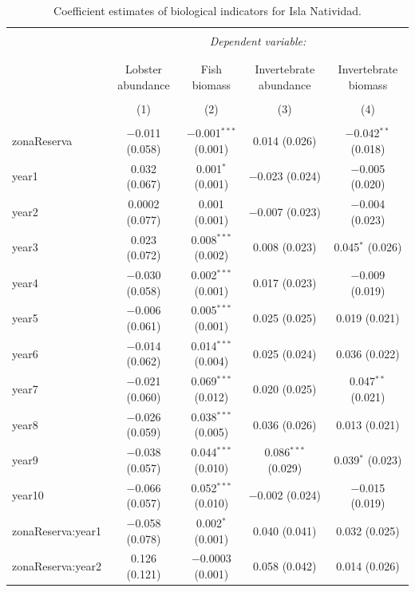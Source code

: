 \documentclass[utf8]{frontiers_suppmat} %
\begin{document}
\begin{table}[!htbp] \centering 
  \caption{Coefficient estimates of biological indicators for Isla Natividad.} 
  \label{} 
\tiny 
\begin{tabular}{@{\extracolsep{1pt}}lcccc} 
\\[-1.8ex]\hline 
\hline \\[-1.8ex] 
 & \multicolumn{4}{c}{\textit{Dependent variable:}} \\ 
\cline{2-5} 
\\[-1.8ex] & \multicolumn{4}{c}{} \\ 
 & Lobster abundance & Fish biomass & Invertebrate abundance & Invertebrate biomass \\ 
\\[-1.8ex] & (1) & (2) & (3) & (4)\\ 
\hline \\[-1.8ex] 
 zonaReserva & $-$0.011 (0.058) & $-$0.001$^{***}$ (0.001) & 0.014 (0.026) & $-$0.042$^{**}$ (0.018) \\ 
  year1 & 0.032 (0.067) & 0.001$^{*}$ (0.001) & $-$0.023 (0.024) & $-$0.005 (0.020) \\ 
  year2 & 0.0002 (0.077) & 0.001 (0.001) & $-$0.007 (0.023) & $-$0.004 (0.023) \\ 
  year3 & 0.023 (0.072) & 0.008$^{***}$ (0.002) & 0.008 (0.023) & 0.045$^{*}$ (0.026) \\ 
  year4 & $-$0.030 (0.058) & 0.002$^{***}$ (0.001) & 0.017 (0.023) & $-$0.009 (0.019) \\ 
  year5 & $-$0.006 (0.061) & 0.005$^{***}$ (0.001) & 0.025 (0.025) & 0.019 (0.021) \\ 
  year6 & $-$0.014 (0.062) & 0.014$^{***}$ (0.004) & 0.025 (0.024) & 0.036 (0.022) \\ 
  year7 & $-$0.021 (0.060) & 0.069$^{***}$ (0.012) & 0.020 (0.025) & 0.047$^{**}$ (0.021) \\ 
  year8 & $-$0.026 (0.059) & 0.038$^{***}$ (0.005) & 0.036 (0.026) & 0.013 (0.021) \\ 
  year9 & $-$0.038 (0.057) & 0.044$^{***}$ (0.010) & 0.086$^{***}$ (0.029) & 0.039$^{*}$ (0.023) \\ 
  year10 & $-$0.066 (0.057) & 0.052$^{***}$ (0.010) & $-$0.002 (0.024) & $-$0.015 (0.019) \\ 
  zonaReserva:year1 & $-$0.058 (0.078) & 0.002$^{*}$ (0.001) & 0.040 (0.041) & 0.032 (0.025) \\ 
  zonaReserva:year2 & 0.126 (0.121) & $-$0.0003 (0.001) & 0.058 (0.042) & 0.014 (0.026) \\ 

\end{tabular}
\end{table}
\end{document}
